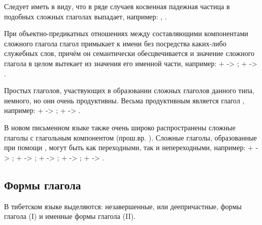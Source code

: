 Следует иметь в виду, что в ряде случаев косвенная падежная частица в подобных сложных глаголах выпадает, например:
,
.

При объектно-предикатных отношениях между составляющими компонентами сложного глагола глагол примыкает к имени без посредства каких-либо служебных слов, причём он семантически обесцвечивается и значение сложного глагола в целом вытекает из значения его именной части, например:
 +  -> ;
 +  -> .

Простых глаголов, участвующих в образовании сложных глаголов данного типа, немного, но они очень продуктивны. Весьма продуктивным является глагол , например:
 +  -> ;
 +  -> .

В новом письменном языке также очень широко распространены сложные глаголы с глагольным компонентом  (прош.вр. ). Сложные глаголы, образованные при помощи , могут быть как переходными, так и непереходными, например:
 +  -> ;
 +  -> ;
 +  -> ;
 +  -> ;
 +  -> .

\subsection{Формы глагола}

В тибетском языке выделяются: незавершенные, или деепричастные, формы глагола (I) и именные формы глагола (II).

